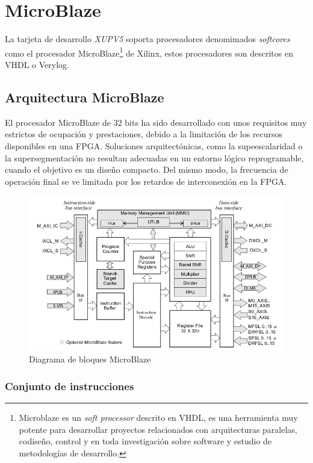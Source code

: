 \chapter{MicroBlaze}

La tarjeta de desarrollo \emph{XUPV5} soporta procesadores
denomimados \emph{softcores} como el procesador
MicroBlaze\footnote{Microblaze es un \emph{soft processor} descrito en VHDL,
es una herramienta muy potente para desarrollar proyectos relacionados con
arquitecturas paralelas, codiseño, control y en toda investigación
sobre software y estudio de metodologías de desarrollo.} de
Xilinx, estos procesadores son descritos en VHDL o Verylog.

\section{Arquitectura MicroBlaze}

El procesador MicroBlaze de 32 bits ha sido desarrollado con unos requisitos muy
estrictos de ocupación y prestaciones, debido a la limitación de los recursos
disponibles en una FPGA. Soluciones arquitectónicas, como la supeescalaridad o
la supersegmentación no resultan adecuadas en un entorno lógico reprogramable,
cuando el objetivo es un diseño compacto. Del mismo modo, la frecuencia de
operación final se ve limitada por los retardos de interconexión en la FPGA.

\begin{figure}[h!]
 \centering
 \includegraphics[scale=.55]{./figuras/ublaze.png}
   \caption{Diagrama de bloques MicroBlaze}
 \label{MicroBlaze}
\end{figure}

\subsection{Conjunto de instrucciones}

